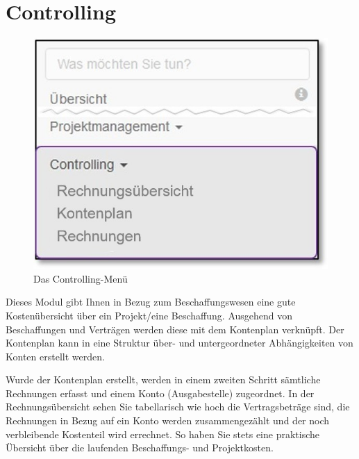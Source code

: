 
\clearpage
\section{Controlling}
\label{bkm:Ref20190423001}

\begin{figure}   %
  \vspace{-35pt}      %
  \begin{center}
    \includegraphics[width=1\linewidth]{../chapters/07_Controlling/pictures/contr_Uebersicht.jpg}
  \end{center}
  \vspace{-20pt}
  \caption{Das Controlling-Menü}
  \vspace{-10pt}
\end{figure}

Dieses Modul gibt Ihnen in Bezug zum Beschaffungswesen eine gute Kostenübersicht über ein Projekt/eine Beschaffung.
Ausgehend von Beschaffungen und Verträgen werden diese mit dem Kontenplan verknüpft. Der Kontenplan kann in eine Struktur über- und untergeordneter Abhängigkeiten von Konten erstellt werden.

\vspace{2cm} 

Wurde der Kontenplan erstellt, werden in einem zweiten Schritt sämtliche Rechnungen erfasst und einem Konto (Ausgabestelle) zugeordnet. In der Rechnungsübersicht sehen Sie tabellarisch wie hoch die Vertragsbeträge sind, die Rechnungen in Bezug auf ein Konto werden zusammengezählt und der noch verbleibende Kostenteil wird errechnet. So haben Sie stets eine praktische Übersicht über die laufenden Beschaffungs- und Projektkosten.


